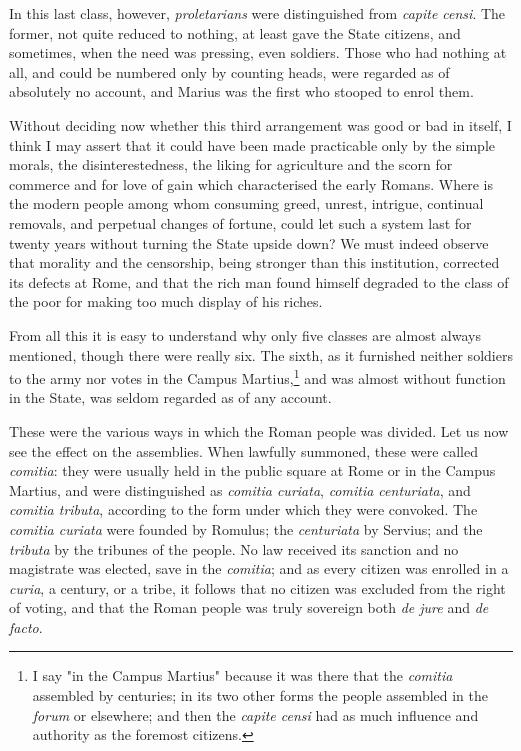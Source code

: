 \documentclass[12pt]{report}
\begin{document}
In this last class, however, \textit{proletarians} were distinguished from \textit{capite censi}. The former, not quite reduced to nothing, at least gave the State citizens, and sometimes, when the need was pressing, even soldiers. Those who had nothing at all, and could be numbered only by counting heads, were regarded as of absolutely no account, and Marius was the first who stooped to enrol them.

Without deciding now whether this third arrangement was good or bad in itself, I think I may assert that it could have been made practicable only by the simple morals, the disinterestedness, the liking for agriculture and the scorn for commerce and for love of gain which characterised the early Romans. Where is the modern people among whom consuming greed, unrest, intrigue, continual removals, and perpetual changes of fortune, could let such a system last for twenty years without turning the State upside down? We must indeed observe that morality and the censorship, being stronger than this institution, corrected its defects at Rome, and that the rich man found himself degraded to the class of the poor for making too much display of his riches.

From all this it is easy to understand why only five classes are almost always mentioned, though there were really six. The sixth, as it furnished neither soldiers to the army nor votes in the Campus Martius,\footnote{I say "in the Campus Martius" because it was there that the \textit{comitia} assembled by centuries; in its two other forms the people assembled in the \textit{forum} or elsewhere; and then the \textit{capite censi} had as much influence and authority as the foremost citizens.} and was almost without function in the State, was seldom regarded as of any account.

These were the various ways in which the Roman people was divided. Let us now see the effect on the assemblies. When lawfully summoned, these were called \textit{comitia}: they were usually held in the public square at Rome or in the Campus Martius, and were distinguished as \textit{comitia curiata}, \textit{comitia centuriata}, and \textit{comitia tributa}, according to the form under which they were convoked. The \textit{comitia curiata} were founded by Romulus; the \textit{centuriata} by Servius; and the \textit{tributa} by the tribunes of the people. No law received its sanction and no magistrate was elected, save in the \textit{comitia}; and as every citizen was enrolled in a \textit{curia}, a century, or a tribe, it follows that no citizen was excluded from the right of voting, and that the Roman people was truly sovereign both \textit{de jure} and \textit{de facto}.
\end{document}
